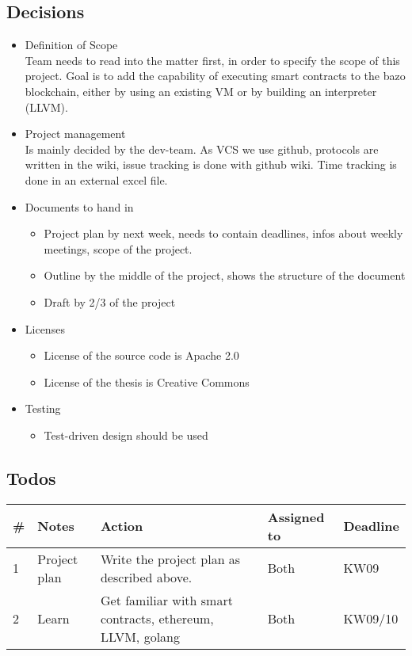 \subsection{Decisions}
\begin{itemize}
\item
  Definition of Scope\\
  Team needs to read into the matter first, in order to specify the
  scope of this project. Goal is to add the capability of executing
  smart contracts to the bazo blockchain, either by using an existing VM
  or by building an interpreter (LLVM).
\item
  Project management\\
  Is mainly decided by the dev-team. As VCS we use github, protocols are
  written in the wiki, issue tracking is done with github wiki. Time
  tracking is done in an external excel file.
\item
  Documents to hand in

  \begin{itemize}
  \item
    Project plan by next week, needs to contain deadlines, infos about
    weekly meetings, scope of the project.
  \item
    Outline by the middle of the project, shows the structure of the
    document
  \item
    Draft by 2/3 of the project
  \end{itemize}
\item
  Licenses

  \begin{itemize}
  \item
    License of the source code is Apache 2.0
  \item
    License of the thesis is Creative Commons
  \end{itemize}
\item
  Testing

  \begin{itemize}
  \item
    Test-driven design should be used
  \end{itemize}
\end{itemize}

\subsection{Todos}
\begin{table}[H]
\centering
\begin{tabular}{L{1cm} L{3cm} L{6cm} L{1.5cm} L{1.5cm}}
\toprule
\# & Notes               & Action                                            & Assigned to & Deadline \\  & Project plan & Write the project plan as described above.                & Both & KW09    \\
2 & Learn        & Get familiar with smart contracts, ethereum, LLVM, golang & Both & KW09/10 \\ \bottomrule
\end{tabular}
\end{table}